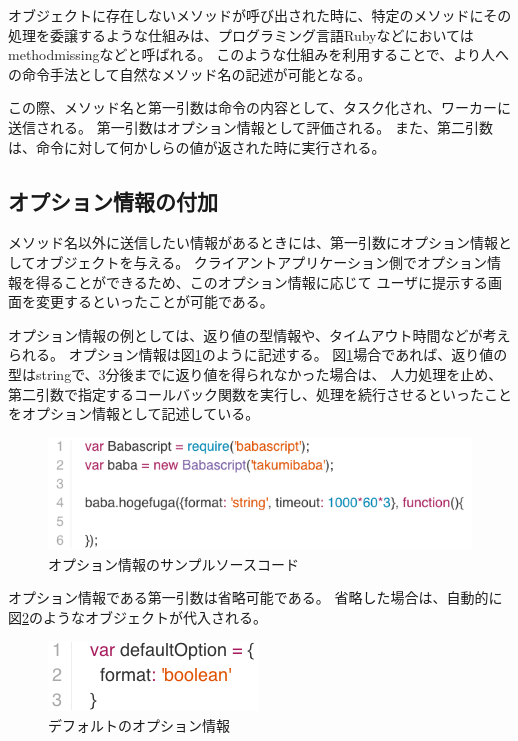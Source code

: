 オブジェクトに存在しないメソッドが呼び出された時に、特定のメソッドにその処理を委譲するような仕組みは、プログラミング言語Rubyなどにおいては
methodmissingなどと呼ばれる。
このような仕組みを利用することで、より人への命令手法として自然なメソッド名の記述が可能となる。

この際、メソッド名と第一引数は命令の内容として、タスク化され、ワーカーに送信される。
第一引数はオプション情報として評価される。
また、第二引数は、命令に対して何かしらの値が返された時に実行される。

\subsection{オプション情報の付加}\label{ux30aaux30d7ux30b7ux30e7ux30f3ux60c5ux5831ux306eux4ed8ux52a0}

メソッド名以外に送信したい情報があるときには、第一引数にオプション情報としてオブジェクトを与える。
クライアントアプリケーション側でオプション情報を得ることができるため、このオプション情報に応じて
ユーザに提示する画面を変更するといったことが可能である。

オプション情報の例としては、返り値の型情報や、タイムアウト時間などが考えられる。
オプション情報は図\ref{fig:babascript_option}のように記述する。
図\ref{fig:babascript_option}場合であれば、返り値の型はstringで、3分後までに返り値を得られなかった場合は、
人力処理を止め、第二引数で指定するコールバック関数を実行し、処理を続行させるといったことをオプション情報として記述している。

\begin{figure}[htbp]
  \begin{center}
  \includegraphics[width=.8\linewidth,bb=0 0 563 149]{images/babascript_option_sample.js.png}
  \end{center}
  \caption{オプション情報のサンプルソースコード}
  \label{fig:babascript_option}
\end{figure}

オプション情報である第一引数は省略可能である。
省略した場合は、自動的に図\ref{fig:option_default}のようなオブジェクトが代入される。

\begin{figure}[htbp]
  \begin{center}
  \includegraphics[width=.4\linewidth,bb=0 0 210 70]{images/option_default.js.png}
  \end{center}
  \caption{デフォルトのオプション情報}
  \label{fig:option_default}
\end{figure}

